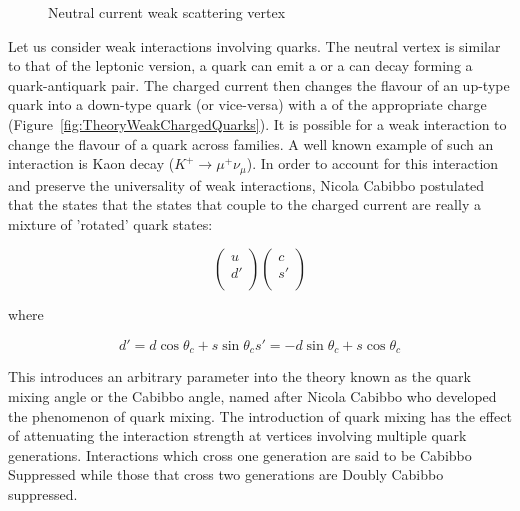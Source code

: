 \begin{figure}
  \centering
  
  \caption{Neutral current weak scattering vertex} \label{fig:TheoryMuonDecay}
\end{figure}

Let us consider weak interactions involving quarks. The neutral vertex is similar to that of the leptonic version, a quark can emit a \ZbosonText{} or a \ZbosonText{} can decay forming a quark-antiquark pair. The charged current then changes the flavour of an up-type quark into a down-type quark (or vice-versa) with a \WbosonText{} of the appropriate charge (Figure~\ref{fig:TheoryWeakChargedQuarks}). It is possible for a weak interaction to change the flavour of a quark across families. A well known example of such an interaction is Kaon decay ($K^{+}\rightarrow \mu^{+}\nu_{\mu}$). In order to account for this interaction and preserve the universality of weak interactions, Nicola Cabibbo postulated\cite{Theory:CKMNicola} that the states that the states that couple to the charged current are really a mixture of 'rotated' quark states:

\begin{equation}
\begin{pmatrix}
  u \\
  d' \\
\end{pmatrix}
\begin{pmatrix}
  c \\
  s' \\
\end{pmatrix}
\end{equation}

where

\begin{subequations}
  \begin{equation}
  \label{eq:TheoryWeakQuarkMixingEq1}
  d'=d\cos\theta_{c} + s\sin\theta_{c}
  \end{equation}
  \begin{equation}
  \label{eq:TheoryWeakQuarkMixingEq2}
  s'=-d\sin\theta_{c} + s\cos\theta_{c}
  \end{equation}
\end{subequations}

This introduces an arbitrary parameter into the theory known as the quark mixing angle or the Cabibbo angle, named after Nicola Cabibbo who developed the phenomenon of quark mixing. The introduction of quark mixing has the effect of attenuating the interaction strength at vertices involving multiple quark generations. Interactions which cross one generation are said to be Cabibbo Suppressed while those that cross two generations are Doubly Cabibbo suppressed.

